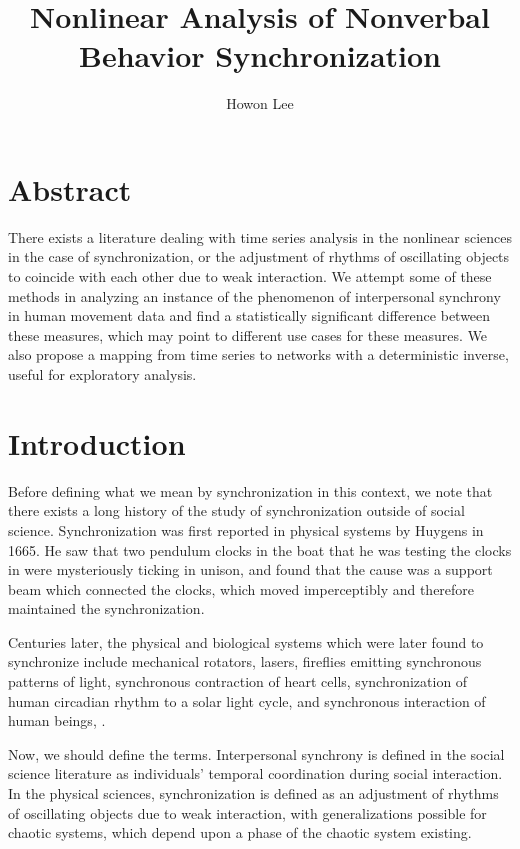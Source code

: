 \documentclass[12pt]{article}
\begin{document}
\title{Nonlinear Analysis of Nonverbal Behavior Synchronization}
\author{Howon Lee}
\maketitle

\section{Abstract}
There exists a literature dealing with time series analysis in the nonlinear sciences in the case of synchronization, or the adjustment of rhythms of oscillating objects to coincide with each other due to weak interaction. We attempt some of these methods in analyzing an instance of the phenomenon of interpersonal synchrony in human movement data and find a statistically significant difference between these measures, which may point to different use cases for these measures. We also propose a mapping from time series to networks with a deterministic inverse, useful for exploratory analysis.

\section{Introduction}

Before defining what we mean by synchronization in this context, we note that there exists a long history of the study of synchronization outside of social science. Synchronization was first reported in physical systems by Huygens in 1665. He saw that two pendulum clocks in the boat that he was testing the clocks in were mysteriously ticking in unison, and found that the cause was a support beam which connected the clocks, which moved imperceptibly and therefore maintained the synchronization\cite{physsync}.

Centuries later, the physical and biological systems which were later found to synchronize include mechanical rotators, lasers, fireflies emitting synchronous patterns of light, synchronous contraction of heart cells, synchronization of human circadian rhythm to a solar light cycle, and synchronous interaction of human beings\cite{syncreview}, \cite{physsync}.

Now, we should define the terms. Interpersonal synchrony is defined in the social science literature as individuals' temporal coordination during social interaction\cite{socialsync}. In the physical sciences, synchronization is defined as an adjustment of rhythms of oscillating objects due to weak interaction, with generalizations possible for chaotic systems, which depend upon a phase of the chaotic system existing\cite{physsync}.
\end{document}
